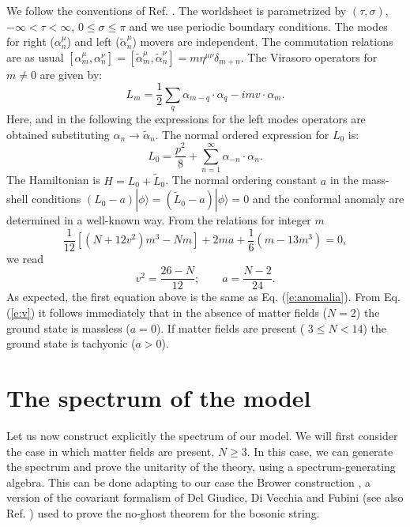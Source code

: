 \documentclass[a4paper,aps,prd,twocolumn,groupedaddress]{revtex4}
\begin{document}
We follow the conventions of Ref. \cite{gsw}.  The worldsheet is
parametrized by $(\tau,\sigma)$, $-\infty < \tau < \infty$, $0\le
\sigma \le \pi$ and we use periodic boundary conditions.  The modes
for right ($\alpha_n^\mu$) and left ($\tilde\alpha_n^\mu$) movers are
independent. The commutation relations are as usual
$[\alpha_m^\mu,\alpha_n^\nu]=[\tilde\alpha_m^\mu,\tilde\alpha_n^\nu]=
m\eta^{\mu\nu}\delta_{m+n}$. The Virasoro operators for $m\ne 0$ are
given by:
\begin{equation}\label{e:vira}
L_m = \frac{1}{2}\sum_q \alpha_{m-q}\cdot\alpha_q -imv\cdot 
\alpha_m.
\end{equation}
Here, and in the following the expressions for the left modes
operators are obtained substituting $\alpha_n \to \tilde\alpha_n$. The
normal ordered expression for $L_0$ is:
\begin{displaymath}
L_0 = \frac{p^2}{8} +\sum_{n=1}^\infty \alpha_{-n}\cdot \alpha_n.
\end{displaymath}
The Hamiltonian is $H = L_0 + \tilde L_0$.  The normal ordering
constant $a$ in the mass-shell conditions $(L_0-a)|\phi\rangle
=(\tilde L_0-a)|\phi\rangle=0$ and the conformal anomaly are
determined in 
a well-known way. From the relations for integer $m$
\begin{displaymath}
\frac{1}{12}[(N+12v^2)m^3-Nm] +2ma+\frac{1}{6}(m-13m^3)=0,
\end{displaymath}
we read
\begin{equation}\label{e:v}
v^2 = \frac{26-N}{12}; \qquad a = \frac{N-2}{24}.
\end{equation}
As expected, the first equation above is the same as
Eq. (\ref{e:anomalia}). From Eq. (\ref{e:v}) it follows immediately that
in the absence of matter fields ($N=2$) the ground state is massless
($a=0$). If matter fields are present ( $3\le N < 14$) the ground
state is tachyonic ($a>0$).

\section{The spectrum of the model}
Let us now construct explicitly the spectrum of our model. We will
first consider the case in which matter fields are present,
$N\ge3$. In this case, we can generate the spectrum and prove the
unitarity of the theory, using a spectrum-generating algebra.  This
can be done adapting to our case the Brower construction \cite{br}, a
version of the covariant formalism of Del Giudice, Di Vecchia and
Fubini \cite{DDF} (see also Ref. \cite{gsw}) used to prove the
no-ghost theorem for the bosonic string.
\end{document}
